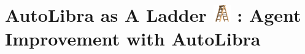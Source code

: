 \documentclass[../main.tex]{subfiles}
\begin{document}
\section{AutoLibra as A Ladder \protect
\includegraphics[height=1em]{figs/ladder.png}
: Agent Improvement with AutoLibra}
\label{sec:ladder}


\end{document}
